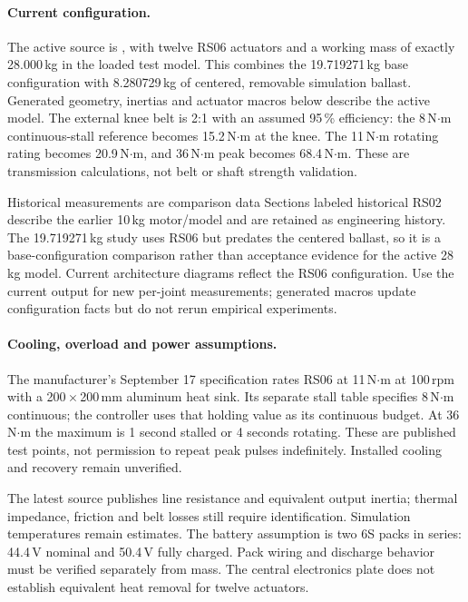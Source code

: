 \documentclass[11pt,a4paper]{article}
\begin{document}
\paragraph{Current configuration.} The active source is
, with twelve RS06 actuators and a working mass
of exactly 28.000\,kg in the loaded test model. This combines the
19.719271\,kg base configuration with 8.280729\,kg of centered, removable
simulation ballast. Generated geometry, inertias and actuator macros below
describe the active model. The external knee belt is 2:1 with an assumed
95\,\% efficiency: the 8\,N$\cdot$m continuous-stall reference becomes
15.2\,N$\cdot$m at the knee. The 11\,N$\cdot$m rotating rating becomes
20.9\,N$\cdot$m, and 36\,N$\cdot$m peak becomes 68.4\,N$\cdot$m.
These are transmission calculations, not belt or shaft strength validation.

\begin{caveat}{Historical measurements are comparison data}
Sections labeled historical RS02 describe the earlier 10\,kg motor/model and
are retained as engineering history. The 19.719271\,kg study uses RS06 but
predates the centered ballast, so it is a base-configuration comparison rather
than acceptance evidence for the active 28\,kg model.
Current architecture diagrams reflect the RS06 configuration. Use the current
 output for new per-joint measurements; generated
macros update configuration facts but do not rerun empirical experiments.
\end{caveat}

\paragraph{Cooling, overload and power assumptions.} The manufacturer's
September 17 specification rates RS06 at 11\,N$\cdot$m at 100\,rpm with a
200\,$\times$\,200\,mm aluminum heat sink. Its separate stall table specifies
8\,N$\cdot$m continuous; the controller uses that holding value as its
continuous budget. At 36\,N$\cdot$m the maximum is 1 second stalled or
4 seconds rotating. These are published test points, not permission to repeat
peak pulses indefinitely. Installed cooling and recovery remain unverified.

The latest source publishes line resistance and equivalent output inertia;
thermal impedance, friction and belt losses still require identification.
Simulation temperatures remain estimates. The battery assumption is two 6S
packs in series: 44.4\,V nominal and 50.4\,V fully charged. Pack wiring and
discharge behavior must be verified separately from mass. The central electronics
plate does not establish equivalent heat removal for twelve actuators.
\end{document}
